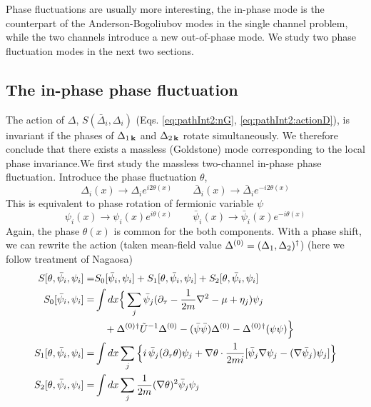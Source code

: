 Phase fluctuations are usually more interesting, the in-phase mode is the counterpart of the Anderson-Bogoliubov modes in the single channel problem, while the two channels introduce a new out-of-phase mode. We study two phase fluctuation modes in the next two sections. 
\subsection{The in-phase phase fluctuation }
The action of $\Delta$, $S(\bar{\Delta}_i,\Delta_i)$ (Eqs. \ref{eq:pathInt2:nG}, \ref{eq:pathInt2:actionD}), is invariant if the phases of $\Delta_{1\,\mathbf{k}}$ and $\Delta_{2\,\mathbf{k}}$ rotate simultaneously. We therefore conclude that there exists a massless (Goldstone) mode corresponding to the local phase invariance.We first study the massless two-channel in-phase phase fluctuation.   Introduce the phase fluctuation $\theta$, 
\begin{equation*}
\Delta_{i}(x)\rightarrow{}\Delta_{i}e^{i2\theta(x)}\qquad{}
\bar{\Delta}_{i}(x)\rightarrow{}\bar{\Delta}_{i}e^{-i2\theta(x)}
\end{equation*}
This is equivalent to  phase  rotation of fermionic variable $\psi$
\begin{equation*}
\psi_{i}(x)\rightarrow{}\psi_{i}(x)e^{i\theta(x)}\qquad{}
\bar{\psi}_{i}(x)\rightarrow{}\bar{\psi}_{i}(x)e^{-i\theta(x)}
\end{equation*}
Again, the phase $\theta(x)$ is common for the both components.   With a phase shift, we can rewrite the action (taken mean-field value $\Delta^{(0)}=(\Delta_1,\Delta_2)^{\dagger}$) (here we  follow treatment of Nagaosa\cite{Nagaosa})
\begin{subequations}\label{eq:pathInt2:actionPhase}
\begin{align}
S[\theta,\bar\psi_{i},\psi_{i}]=&S_0[\bar\psi_{i},\psi_{i}]+S_1[\theta,\bar\psi_{i},\psi_{i}]+S_2[\theta,\bar\psi_{i},\psi_{i}]\\
S_0[\bar\psi_{i},\psi_{i}]=&\int{dx}
\Big\{\sum_{j}\bar\psi_{j}(\partial_\tau-\frac{1}{2m}\nabla^{2}-\mu+\eta_{j})\psi_{j}\nonumber\\
&\quad+\Delta^{(0)}{}^{\dagger}\tilde{U}^{-1}\Delta^{(0)}-(\bar\psi\bar\psi)\Delta^{(0)}-{\Delta^{(0)}}{}^{\dagger}(\psi\psi)\Big\}\\
S_1[\theta,\bar\psi_{i},\psi_{i}]=&\int{dx}\sum_{j}\Big\{
   i\,\bar\psi_{j}(\partial_{\tau}\theta)\psi_{j}+\nabla\theta\cdot\frac{1}{2mi}[\bar\psi_{j}\nabla\psi_{j}-(\nabla\bar{\psi}_{j})\psi_{j}]\Big\}\\
S_2[\theta,\bar\psi_{i},\psi_{i}]=&\int{dx}\sum_{j}\frac{1}{2m}(\nabla\theta)^{2}\bar\psi_{j}\psi_{j}
\end{align}
\end{subequations}
